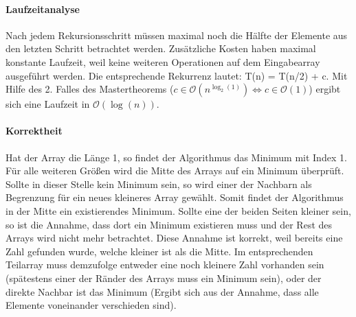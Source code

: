 \documentclass[12pt]{scrartcl}%
\theoremstyle{nonumberplain}
\newcommand{\bO}[1]{\mathcal O(#1)}
\begin{document}
\paragraph{Laufzeitanalyse} Nach jedem Rekursionsschritt müssen maximal noch die Hälfte der Elemente aus den letzten Schritt betrachtet werden. Zusätzliche Kosten haben maximal konstante Laufzeit, weil keine weiteren Operationen auf dem Eingabearray ausgeführt werden. Die entsprechende Rekurrenz lautet: T(n) = T(n/2) + c. Mit Hilfe des 2. Falles des Mastertheorems ($c \in \bO{n^{\log_2{(1)}}} \Leftrightarrow c \in \bO{1}$) ergibt sich eine Laufzeit in $\bO{\log(n)}$.

\paragraph{Korrektheit} Hat der Array die Länge 1, so findet der Algorithmus das Minimum mit Index 1. Für alle weiteren Größen wird die Mitte des Arrays auf ein Minimum überprüft. Sollte in dieser Stelle kein Minimum sein, so wird einer der Nachbarn als Begrenzung für ein neues kleineres Array gewählt. Somit findet der Algorithmus in der Mitte ein existierendes Minimum. Sollte eine der beiden Seiten kleiner sein, so ist die Annahme, dass dort ein Minimum existieren muss und der Rest des Arrays wird nicht mehr betrachtet. Diese Annahme ist korrekt, weil bereits eine Zahl gefunden wurde, welche kleiner ist als die Mitte. Im entsprechenden Teilarray muss demzufolge entweder eine noch kleinere Zahl vorhanden sein (spätestens einer der Ränder des Arrays muss ein Minimum sein), oder der direkte Nachbar ist das Minimum (Ergibt sich aus der Annahme, dass alle Elemente voneinander verschieden sind).
\end{document}
